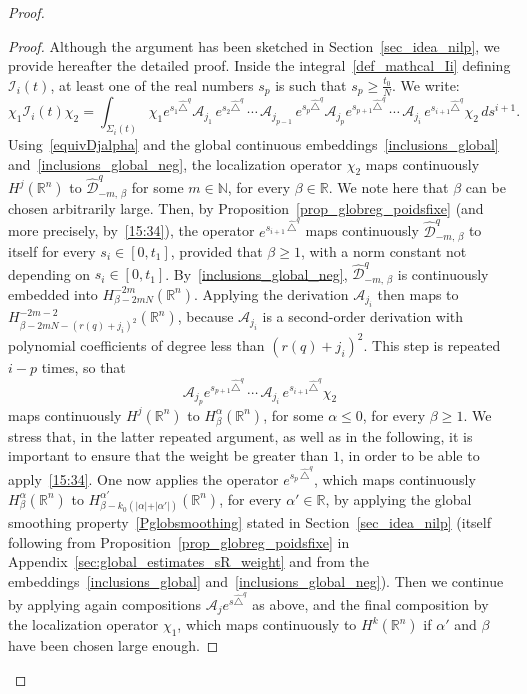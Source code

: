 \documentclass[10pt]{amsart}
\theoremstyle{definition}\newtheorem{defi}[theo]{Definition}\newtheorem{rema}[theo]{Remark}\newtheorem{exam}[theo]{Example}\newtheorem{exem}[theo]{Example}\newtheorem{nota}[theo]{Notation}
\newcommand*\R{\mathbb{R}}
\newcommand*\N{\mathbb{N}}
\newcommand{\calA}{\mathcal{A}}
\newcommand{\calI}{\mathcal{I}}
\newcommand{\calD}{\mathcal{D}}
\renewcommand{\geq}{\geqslant}
\renewcommand{\leq}{\leqslant}
\begin{document}
\begin{proof}
\begin{proof}
Although the argument has been sketched in Section~\ref{sec_idea_nilp}, we provide hereafter the detailed proof. Inside the integral~\eqref{def_mathcal_Ii} defining $\calI_i(t)$, at least one of the real numbers $s_p$ is such that $s_p\geq \frac{t_0}{N}$. We write:
\[
\chi_1\calI_i(t)\chi_2 = \int_{\Sigma_i(t)} \chi_1 e^{s_1 \widehat{\triangle}^{q}} \calA_{j_1} \, e^{s_2 \widehat{\triangle}^{q}}\,\cdots\,\calA_{j_{p-1}} \, e^{s_p \widehat{\triangle}^{q}} \calA_{j_p} e^{s_{p+1} \widehat{\triangle}^{q}}\,\cdots\,\calA_{j_i} \, e^{s_{i+1} \widehat{\triangle}^{q}} \chi_2 \, ds^{i+1}.
\]
Using~\eqref{equivDjalpha} and the global continuous embeddings~\eqref{inclusions_global} and~\eqref{inclusions_global_neg}, the localization operator $\chi_2$ maps continuously $H^j(\R^n)$ to $\widehat{\calD}^{q}_{-m,\,\beta}$ for some $m\in\N$, for every $\beta\in\R$. We note here that $\beta$ can be chosen arbitrarily large. Then, by Proposition~\ref{prop_globreg_poidsfixe} (and more precisely, by~\eqref{15:34}), the operator $e^{s_{i+1} \,\widehat{\triangle}^{q}}$ maps continuously $\widehat{\calD}^{q}_{-m,\,\beta}$ to itself for every $s_i\in[0,t_1]$, provided that $\beta\geq 1$, with a norm constant not depending on $s_i\in[0,t_1]$. By~\eqref{inclusions_global_neg}, $\widehat{\calD}^{q}_{-m,\,\beta}$ is continuously embedded into $H^{-2m}_{\beta-2mN}(\R^n)$. Applying the derivation $\calA_{j_i}$ then maps to $H^{-2m-2}_{\beta-2mN-(r(q)+j_i)^2}(\R^n)$, because $\calA_{j_i}$ is a second-order derivation with polynomial coefficients of degree less than $(r(q)+j_i)^2$. This step is repeated $i-p$ times, so that
\[
\calA_{j_p} e^{s_{p+1} \widehat{\triangle}^{q}}\,\cdots
\,\calA_{j_i} \, e^{s_{i+1} \widehat{\triangle}^{q}} \chi_2
\]
maps continuously $H^j(\R^n)$ to $H^\alpha_\beta(\R^n)$, for some $\alpha\leq 0$, for every $\beta\geq 1$. We stress that, in the latter repeated argument, as well as in the following, it is important to ensure that the weight be greater than $1$, in order to be able to apply~\eqref{15:34}. One now applies the operator $e^{s_p\,\widehat{\triangle}^{q}}$, which maps continuously $H^{\alpha}_{\beta}(\R^n)$ to $H^{\alpha'}_{\beta-k_0(\vert\alpha\vert+\vert\alpha'\vert)}(\R^n)$, for every $\alpha'\in\R$, by applying the global smoothing property~\eqref{Pglobsmoothing} stated in Section~\ref{sec_idea_nilp} (itself following from Proposition~\ref{prop_globreg_poidsfixe} in Appendix~\ref{sec:global_estimates_sR_weight} and from the embeddings~\eqref{inclusions_global} and~\eqref{inclusions_global_neg}). Then we continue by applying again compositions $\calA_j e^{s\widehat{\triangle}^q}$ as above, and the final composition by the localization operator $\chi_1$, which maps continuously to $H^k(\R^n)$ if $\alpha'$ and $\beta$ have been chosen large enough.
\end{proof}


\end{proof}
\end{document}
